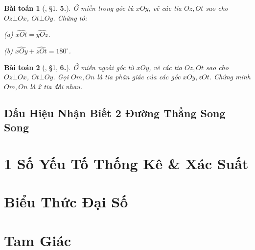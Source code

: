 \documentclass{article}
\numberwithin{equation}{section}
\newtheorem{baitoan}{Bài toán}[section]
\begin{document}
\begin{baitoan}[\cite{Binh_Toan_7_tap_1}, \S1, \textbf{5.}]
	Ở miền trong góc tù $xOy$, vẽ các tia $Oz,Ot$ sao cho $Oz\bot Ox$, $Ot\bot Oy$. Chứng tỏ:
	\begin{enumerate*}
		\item[(a)] $\widehat{xOt} = \widehat{yOz}$.
		\item[(b)] $\widehat{xOy} + \widehat{zOt} = 180^\circ$.
	\end{enumerate*}
\end{baitoan}

\begin{baitoan}[\cite{Binh_Toan_7_tap_1}, \S1, \textbf{6.}]
	Ở miền ngoài góc tù $xOy$, vẽ các tia $Oz,Ot$ sao cho $Oz\bot Ox$, $Ot\bot Oy$. Gọi $Om,On$ là tia phân giác của các góc $xOy,zOt$. Chứng minh $Om,On$ là 2 tia đối nhau.
\end{baitoan}


\subsection{Dấu Hiệu Nhận Biết 2 Đường Thẳng Song Song}


\section{1 Số Yếu Tố Thống Kê \& Xác Suất}


\section{Biểu Thức Đại Số}


\section{Tam Giác}


\printbibliography[heading=bibintoc]
	
\end{document}
